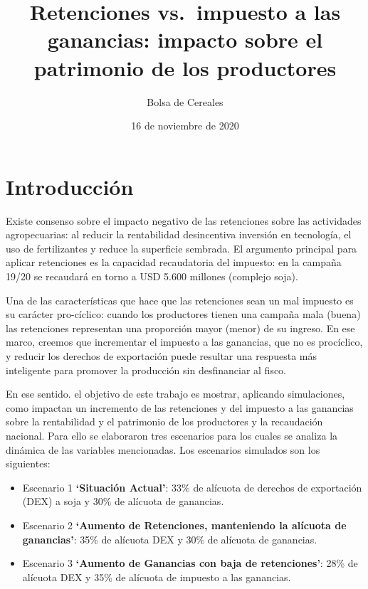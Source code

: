 \documentclass[
  12pt,
  spanish,
  10pt]{article}
\title{Retenciones vs.~impuesto a las ganancias: impacto sobre el
patrimonio de los productores}
\author{Bolsa de Cereales}
\date{16 de noviembre de 2020}
\providecommand{\tightlist}{%
  \setlength{\itemsep}{0pt}\setlength{\parskip}{0pt}}
\begin{document}
\maketitle

{
\setcounter{tocdepth}{1}
\tableofcontents
}
\hypertarget{introducciuxf3n}{%
\section{Introducción}\label{introducciuxf3n}}

Existe consenso sobre el impacto negativo de las retenciones sobre las
actividades agropecuarias: al reducir la rentabilidad desincentiva
inversión en tecnología, el uso de fertilizantes y reduce la superficie
sembrada. El argumento principal para aplicar retenciones es la
capacidad recaudatoria del impuesto: en la campaña 19/20 se recaudará en
torno a USD 5.600 millones (complejo soja).

Una de las características que hace que las retenciones sean un mal
impuesto es su carácter pro-cíclico: cuando los productores tienen una
campaña mala (buena) las retenciones representan una proporción mayor
(menor) de su ingreso. En ese marco, creemos que incrementar el impuesto
a las ganancias, que no es procíclico, y reducir los derechos de
exportación puede resultar una respuesta más inteligente para promover
la producción sin desfinanciar al fisco.

En ese sentido. el objetivo de este trabajo es mostrar, aplicando
simulaciones, como impactan un incremento de las retenciones y del
impuesto a las ganancias sobre la rentabilidad y el patrimonio de los
productores y la recaudación nacional. Para ello se elaboraron tres
escenarios para los cuales se analiza la dinámica de las variables
mencionadas. Los escenarios simulados son los siguientes:

\begin{itemize}
\tightlist
\item
  Escenario 1 \textbf{`Situación Actual'}: 33\% de alícuota de derechos
  de exportación (DEX) a soja y 30\% de alícuota de ganancias.
\item
  Escenario 2 \textbf{`Aumento de Retenciones, manteniendo la alícuota
  de ganancias'}: 35\% de alícuota DEX y 30\% de alícuota de ganancias.
\item
  Escenario 3 \textbf{`Aumento de Ganancias con baja de retenciones'}:
  28\% de alícuota DEX y 35\% de alícuota de impuesto a las ganancias.
\end{itemize}
\end{document}
